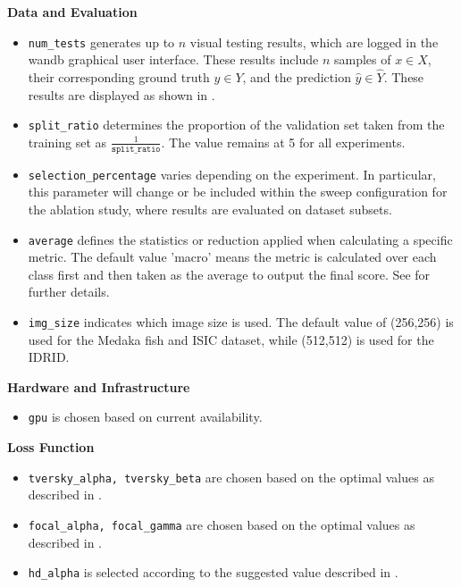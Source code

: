 \textbf{Data and Evaluation}
\begin{itemize}
  \item \texttt{num\_tests} generates up to $n$ visual testing results, which are logged in the \acf{wandb} graphical user interface. These results include $n$ samples of $x\in X$, their corresponding ground truth $y\in Y$, and the prediction $\hat{y}\in \hat{Y}$. These results are displayed as shown in .
  \item \texttt{split\_ratio} determines the proportion of the validation set taken from the training set as $\frac{1}{\texttt{split\_ratio}}$. The value remains at 5 for all experiments.
  \item \texttt{selection\_percentage} varies depending on the experiment. In particular, this parameter will change or be included within the sweep configuration for the ablation study, where results are evaluated on dataset subsets.
  \item \texttt{average} defines the statistics or reduction applied when calculating a specific metric. The default value 'macro' means the metric is calculated over each class first and then taken as the average to output the final score. See  for further details.
  \item \texttt{img\_size} indicates which image size is used. The default value of (256,256) is used for the Medaka fish and \ac{ISIC} dataset, while (512,512) is used for the \ac{IDRID}.
\end{itemize}

\textbf{Hardware and Infrastructure}
\begin{itemize}
  \item \texttt{gpu} is chosen based on current availability.
\end{itemize}

\textbf{Loss Function}
\begin{itemize}
  \item \texttt{tversky\_alpha, tversky\_beta} are chosen based on the optimal values as described in \cite{DBLP:journals/corr/SalehiEG17a}.
  \item \texttt{focal\_alpha, focal\_gamma} are chosen based on the optimal values as described in \cite{lin2017focal}.
  \item \texttt{hd\_alpha} is selected according to the suggested value described in \cite{8767031}.
\end{itemize}

